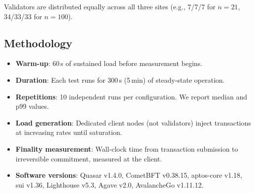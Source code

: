 Validators are distributed equally across all three sites (e.g., 7/7/7 for $n=21$,
34/33/33 for $n=100$).

\subsection{Methodology}

\begin{itemize}
\item \textbf{Warm-up}: 60\,s of sustained load before measurement begins.
\item \textbf{Duration}: Each test runs for 300\,s (5\,min) of steady-state operation.
\item \textbf{Repetitions}: 10 independent runs per configuration. We report median
      and p99 values.
\item \textbf{Load generation}: Dedicated client nodes (not validators) inject
      transactions at increasing rates until saturation.
\item \textbf{Finality measurement}: Wall-clock time from transaction submission to
      irreversible commitment, measured at the client.
\item \textbf{Software versions}: Quasar v1.4.0, CometBFT v0.38.15, aptos-core v1.18,
      sui v1.36, Lighthouse v5.3, Agave v2.0, AvalancheGo v1.11.12.
\end{itemize}

